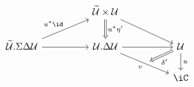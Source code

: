 \[\begin{tikzcd}
	&& {\Tm \times \Ty} \\
	{\Tm.\Sigma\Delta\Ty} && {\Ty.\Delta\Ty} && \Ty \\
	&&&& \iC
	\arrow[from=1-3, to=2-5]
	\arrow["{u^{*}\id}", from=2-1, to=1-3]
	\arrow[from=2-1, to=2-3]
	\arrow[from=2-3, to=2-5]
	\arrow["u", from=2-5, to=3-5]
	\arrow[""{name=0, anchor=center, inner sep=0}, "v"', from=2-3, to=3-5]
	\arrow["{u^{*}\eta'}", Rightarrow, from=1-3, to=2-3]
	\arrow["{\delta'}", shorten >=5pt, Rightarrow, from=2-5, to=0]
\end{tikzcd}\]